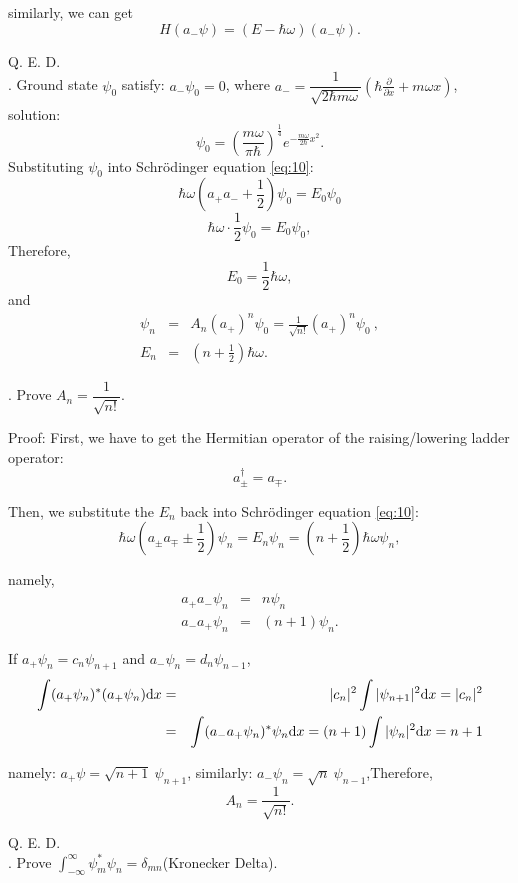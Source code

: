 \documentclass[12pt, 
]{article}
\begin{document}
similarly, we can get $$H(a_{-}\psi)=(E-\hbar\omega)(a_{-}\psi).$$

Q. E. D.
~\\

. Ground state $\psi_0$ satisfy: $a_{-}\psi_0=0$, where $a_{-}=\dfrac{1}{\sqrt{2\hbar m\omega}}\left (\hbar\frac{\partial}{\partial x}+m\omega x \right)$, solution:
\[
	\psi_0=\left (\frac{m\omega}{\pi\hbar}\right)^{\frac{1}{4}}e^{-\frac{m\omega}{2\hbar}x^2}.
\]
Substituting $\psi_0$ into Schr\"odinger equation \eqref{eq:10}:
\[
	\hbar\omega(a_+a_{-}+\frac{1}{2})\psi_0=E_0\psi_0 
\]
\[
	\hbar\omega\cdot\frac{1}{2}\psi_0=E_0\psi_0,
\]
Therefore,
\begin{equation}\label{eq:11}
	E_0=\frac{1}{2}\hbar\omega,
\end{equation}
and
\begin{eqnarray*}
	\psi_n&=&A_n(a_+)^n\psi_0=\frac{1}{\sqrt{n!}}(a_+)^n\psi_0~,\\
	E_n&=&(n+\frac{1}{2})\hbar\omega.
\end{eqnarray*}

. Prove $A_n=\dfrac{1}{\sqrt{n!}}.$

\noindent Proof: First, we have to get the Hermitian operator of the raising/lowering ladder operator:
\[
	a_\pm^{\dagger}=a_\mp.
\]

Then, we substitute the $E_n$ back into Schr\"odinger equation \eqref{eq:10}:
\[
	\hbar\omega(a_\pm a_\mp \pm\frac{1}{2})\psi_n=E_n\psi_n=(n+\frac{1}{2})\hbar\omega\psi_n
,\]

namely,
\begin{eqnarray}
	a_+a_{-}\psi_n&=&n\psi_n\\
	a_{-}a_+\psi_n&=&(n+1)\psi_n.
\end{eqnarray}

If $a_+\psi_n=c_n\psi_{n+1}$ and $a_{-}\psi_n=d_n\psi_{n-1}$,
\begin{eqnarray*}
	\int(a_+\psi_n)^*(a_+\psi_n){\rm d}x&=&|c_n|^2\int|\psi_{n+1}|^2{\rm d}x=|c_n|^2\\
	&=&\int(a_{-}a_+\psi_n)^*\psi_n{\rm d}x=(n+1)\int|\psi_n|^2{\rm d}x=n+1	
\end{eqnarray*}

namely: $a_+\psi=\sqrt{n+1}~\psi_{n+1}$, similarly: $a_{-}\psi_n=\sqrt{n}~\psi_{n-1}$,Therefore,
\[
	A_n=\frac{1}{\sqrt{n!}}.
\]

Q. E. D.
~\\

. Prove $\displaystyle\int_{-\infty}^{\infty}\psi_m^*\psi_n=\delta_{mn}$(Kronecker Delta).
\end{document}
